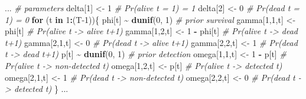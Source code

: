 \documentclass[
  12pt,
]{krantz}
\newenvironment{Shaded}{\begin{snugshade}}{\end{snugshade}}
\newcommand{\CommentTok}[1]{\textcolor[rgb]{0.56,0.35,0.01}{\textit{#1}}}
\newcommand{\ControlFlowTok}[1]{\textcolor[rgb]{0.13,0.29,0.53}{\textbf{#1}}}
\newcommand{\DecValTok}[1]{\textcolor[rgb]{0.00,0.00,0.81}{#1}}
\newcommand{\FunctionTok}[1]{\textcolor[rgb]{0.13,0.29,0.53}{\textbf{#1}}}
\newcommand{\NormalTok}[1]{#1}
\newcommand{\OtherTok}[1]{\textcolor[rgb]{0.56,0.35,0.01}{#1}}
\newcommand{\SpecialCharTok}[1]{\textcolor[rgb]{0.81,0.36,0.00}{\textbf{#1}}}
\begin{document}
\begin{Shaded}
\begin{Highlighting}[]
\NormalTok{...}
\CommentTok{\# parameters}
\NormalTok{  delta[}\DecValTok{1}\NormalTok{] }\OtherTok{\textless{}{-}} \DecValTok{1}                 \CommentTok{\# Pr(alive t = 1) = 1}
\NormalTok{  delta[}\DecValTok{2}\NormalTok{] }\OtherTok{\textless{}{-}} \DecValTok{0}                 \CommentTok{\# Pr(dead t = 1) = 0}
  \ControlFlowTok{for}\NormalTok{ (t }\ControlFlowTok{in} \DecValTok{1}\SpecialCharTok{:}\NormalTok{(T}\DecValTok{{-}1}\NormalTok{))\{}
\NormalTok{    phi[t] }\SpecialCharTok{\textasciitilde{}} \FunctionTok{dunif}\NormalTok{(}\DecValTok{0}\NormalTok{, }\DecValTok{1}\NormalTok{)        }\CommentTok{\# prior survival}
\NormalTok{    gamma[}\DecValTok{1}\NormalTok{,}\DecValTok{1}\NormalTok{,t] }\OtherTok{\textless{}{-}}\NormalTok{ phi[t]      }\CommentTok{\# Pr(alive t {-}\textgreater{} alive t+1)}
\NormalTok{    gamma[}\DecValTok{1}\NormalTok{,}\DecValTok{2}\NormalTok{,t] }\OtherTok{\textless{}{-}} \DecValTok{1} \SpecialCharTok{{-}}\NormalTok{ phi[t]  }\CommentTok{\# Pr(alive t {-}\textgreater{} dead t+1)}
\NormalTok{    gamma[}\DecValTok{2}\NormalTok{,}\DecValTok{1}\NormalTok{,t] }\OtherTok{\textless{}{-}} \DecValTok{0}           \CommentTok{\# Pr(dead t {-}\textgreater{} alive t+1)}
\NormalTok{    gamma[}\DecValTok{2}\NormalTok{,}\DecValTok{2}\NormalTok{,t] }\OtherTok{\textless{}{-}} \DecValTok{1}           \CommentTok{\# Pr(dead t {-}\textgreater{} dead t+1)}
\NormalTok{    p[t] }\SpecialCharTok{\textasciitilde{}} \FunctionTok{dunif}\NormalTok{(}\DecValTok{0}\NormalTok{, }\DecValTok{1}\NormalTok{)          }\CommentTok{\# prior detection}
\NormalTok{    omega[}\DecValTok{1}\NormalTok{,}\DecValTok{1}\NormalTok{,t] }\OtherTok{\textless{}{-}} \DecValTok{1} \SpecialCharTok{{-}}\NormalTok{ p[t]    }\CommentTok{\# Pr(alive t {-}\textgreater{} non{-}detected t)}
\NormalTok{    omega[}\DecValTok{1}\NormalTok{,}\DecValTok{2}\NormalTok{,t] }\OtherTok{\textless{}{-}}\NormalTok{ p[t]        }\CommentTok{\# Pr(alive t {-}\textgreater{} detected t)}
\NormalTok{    omega[}\DecValTok{2}\NormalTok{,}\DecValTok{1}\NormalTok{,t] }\OtherTok{\textless{}{-}} \DecValTok{1}           \CommentTok{\# Pr(dead t {-}\textgreater{} non{-}detected t)}
\NormalTok{    omega[}\DecValTok{2}\NormalTok{,}\DecValTok{2}\NormalTok{,t] }\OtherTok{\textless{}{-}} \DecValTok{0}           \CommentTok{\# Pr(dead t {-}\textgreater{} detected t)}
\NormalTok{  \}}
\NormalTok{...}
\end{Highlighting}
\end{Shaded}
\end{document}
